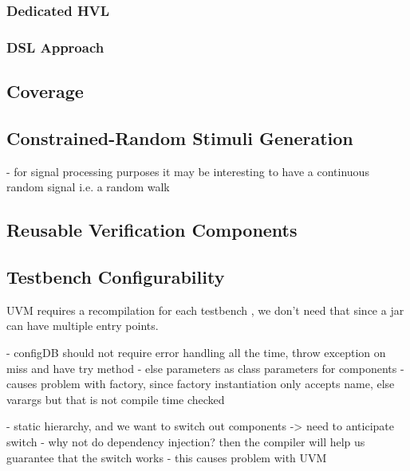 \documentclass[12pt]{report}
\begin{document}
\subsubsection{Dedicated HVL}

\subsubsection{DSL Approach}

\subsection{Coverage} %

\subsection{Constrained-Random Stimuli Generation} %

- for signal processing purposes it may be interesting to have a continuous random signal i.e. a random walk

\subsection{Reusable Verification Components} %

\subsection{Testbench Configurability} %

UVM requires a recompilation for each testbench \cite{salemi2013uvm}, we don't need that since a jar can have
multiple entry points.

- configDB should not require error handling all the time, throw exception on miss and have try method
- else parameters as class parameters for components
- causes problem with factory, since factory instantiation only accepts name, else varargs but that is not compile time checked

- static hierarchy, and we want to switch out components -> need to anticipate switch
- why not do dependency injection? then the compiler will help us guarantee that the switch works
- this causes problem with UVM
\end{document}
